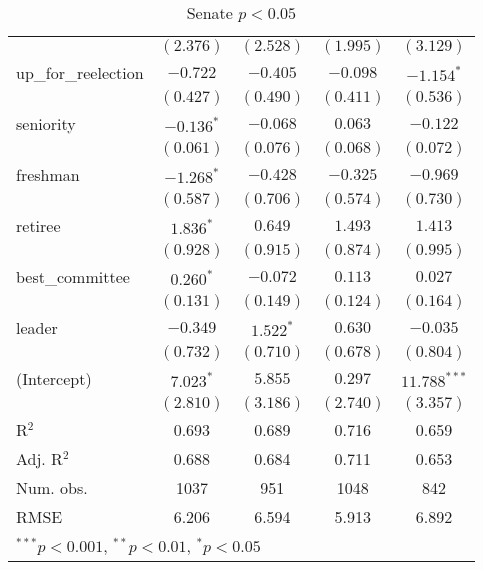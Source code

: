 \documentclass[12pt]{article}
\begin{document}
\begin{table}[ht]
\begin{center}
\begin{tabular}{l c c c c }
			& $(2.376)$      & $(2.528)$     & $(1.995)$      & $(3.129)$      \\
			up\_for\_reelection    & $-0.722$       & $-0.405$      & $-0.098$       & $-1.154^{*}$   \\
			& $(0.427)$      & $(0.490)$     & $(0.411)$      & $(0.536)$      \\
			seniority              & $-0.136^{*}$   & $-0.068$      & $0.063$        & $-0.122$       \\
			& $(0.061)$      & $(0.076)$     & $(0.068)$      & $(0.072)$      \\
			freshman               & $-1.268^{*}$   & $-0.428$      & $-0.325$       & $-0.969$       \\
			& $(0.587)$      & $(0.706)$     & $(0.574)$      & $(0.730)$      \\
			retiree                & $1.836^{*}$    & $0.649$       & $1.493$        & $1.413$        \\
			& $(0.928)$      & $(0.915)$     & $(0.874)$      & $(0.995)$      \\
			best\_committee        & $0.260^{*}$    & $-0.072$      & $0.113$        & $0.027$        \\
			& $(0.131)$      & $(0.149)$     & $(0.124)$      & $(0.164)$      \\
			leader                 & $-0.349$       & $1.522^{*}$   & $0.630$        & $-0.035$       \\
			& $(0.732)$      & $(0.710)$     & $(0.678)$      & $(0.804)$      \\
			(Intercept)            & $7.023^{*}$    & $5.855$       & $0.297$        & $11.788^{***}$ \\
			& $(2.810)$      & $(3.186)$     & $(2.740)$      & $(3.357)$      \\
			\hline
			R$^2$                  & 0.693          & 0.689         & 0.716          & 0.659          \\
			Adj. R$^2$             & 0.688          & 0.684         & 0.711          & 0.653          \\
			Num. obs.              & 1037           & 951           & 1048           & 842            \\
			RMSE                   & 6.206          & 6.594         & 5.913          & 6.892          \\
			\hline
			\multicolumn{5}{l}{\scriptsize{$^{***}p<0.001$, $^{**}p<0.01$, $^*p<0.05$}}
		\end{tabular}
		\caption{Senate $ p < 0.05 $}
	\end{center}
\end{table}
\end{document}
